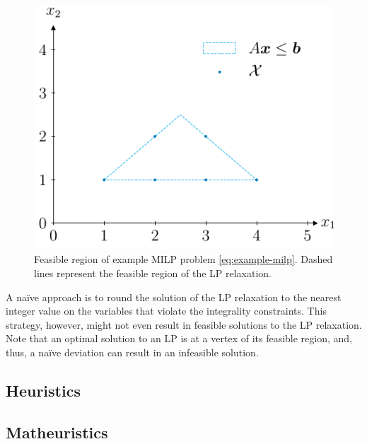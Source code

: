 \begin{figure}[h]
    \centering
    \includegraphics{pictures/milp_example_feasible_region.pdf}
    \caption{Feasible region of example MILP problem \eqref{eq:example-milp}. Dashed lines represent the feasible region of the LP relaxation.}
    \label{fig:milp-example}
\end{figure}

A naïve approach is to round the solution of the LP relaxation to the nearest integer value on the variables that violate the integrality constraints.
This strategy, however, might not even result in feasible solutions to the LP relaxation.
Note that an optimal solution to an LP is at a vertex of its feasible region, and, thus, a naïve deviation can result in an infeasible solution.


\subsection{Heuristics}

\subsection{Matheuristics}

